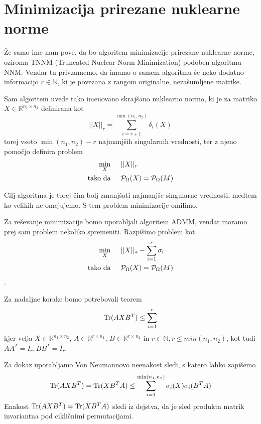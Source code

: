 \section{Minimizacija prirezane nuklearne norme}
Že samo ime nam pove, da bo algoritem minimizacije prirezane nuklearne norme, oziroma TNNM (Truncated Nuclear Norm Minimization) podoben algoritmu NNM. Vendar tu privzamemo, da imamo o samem algoritmu še neko dodatno informacijo $r \in \mathbb{N}$, ki je povezana z rangom originalne, nezašumljene matrike.

Sam algoritem uvede tako imenovano skrajšano nuklearno normo, ki je za matriko $X \in \mathbb{R}^{n_1 \times n_2}$ definirana kot
\[
    ||X||_r = \sum^{\min(n_1, n_2)}_{i = r + 1} \delta_i(X)
\] torej vsoto $\min(n_1,n_2) - r$ najmanjših singularnih vrednosti, ter z 
njeno pomočjo definira problem \cite{TNNM-HZYLH12}
\begin{align*}
    \min_X & \hspace{0.5cm} ||X||_r \\
    \textrm{tako da} & \hspace{0.5cm} \mathcal{P}_\Omega(X) = \mathcal{P}_\Omega(M)
\end{align*}


Cilj algoritma je torej čim bolj zmanjšati najmanjše singularne vrednosti, medtem ko velikih ne omejujemo. S tem problem minimizacije omilimo.

Za reševanje minimizacije bomo uporabljali algoritem ADMM, vendar moramo prej sam problem nekoliko spremeniti. Razpišimo problem kot 
\begin{align*}
    \min_X & \hspace{0.5cm} ||X||_* - \sum_{i=1}^{r} \sigma_i \\
    \textrm{tako da} & \hspace{0.5cm} \mathcal{P}_\Omega(X) = \mathcal{P}_\Omega(M)
\end{align*}.

Za nadaljne korake bomo potrebovali teorem
\[
    \text{Tr}(AXB^T) \leq \sum_{i=1}^{r}
\]
kjer velja $X \in \mathbb{R}^{n_1 \times n_2}$, $A \in \mathbb{R}^{r \times n_1}$, $B \in \mathbb{R}^{r \times n_2}$ in $r \in \mathbb{N}, r \leq min(n_1, n_2)$, kot tudi $AA^T = I_{r}, BB^T = I_{r}$.

Za dokaz uporabljamo Von Neumannovo neenakost sledi, s katero lahko zapišemo 
\[
    \text{Tr}(AXB^T) = \text{Tr}(XB^TA) \leq \sum^{\min(n_1, n_2)}_{i=1} \sigma_i(X) \sigma_i(B^TA)
\]
Enakost $\text{Tr}(AXB^T) = \text{Tr}(XB^TA)$ sledi iz dejstva, da je sled produkta matrik invariantna pod cikličnimi permutacijami.

